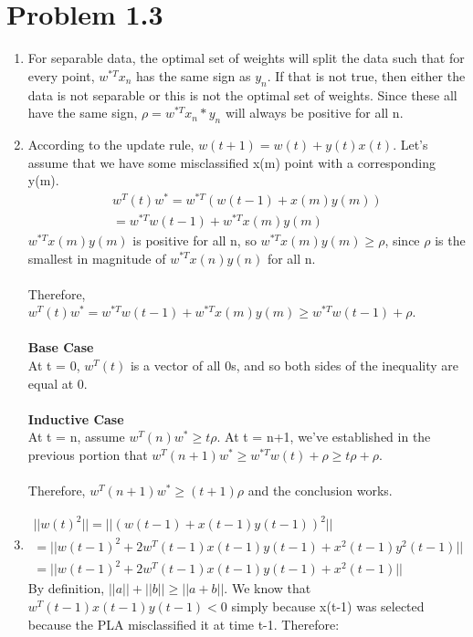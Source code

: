 \documentclass[12pt]{article}
\begin{document}
\section*{Problem 1.3}
\begin{enumerate}[label=(\alph*)]
	\item For separable data, the optimal set of weights will split the data such that for every point, $w^{*T}x_n$ has the same sign as $y_n$. If that is not true, then either the data is not separable or this is not the optimal set of weights. Since these all have the same sign, $\rho = w^{*T}x_n*y_n$ will always be positive for all n.
	\item According to the update rule, $w(t+1) = w(t) + y(t)x(t)$. Let's assume that we have some misclassified x(m) point with a corresponding y(m).
	\begin{gather*}
		w^T(t)w^* = w^{*T}(w(t-1) + x(m)y(m))
		\\ = w^{*T}w(t-1) + w^{*T}x(m)y(m)
	\end{gather*}
	$w^{*T}x(m)y(m)$ is positive for all n, so $w^{*T}x(m)y(m) \ge \rho$, since $\rho$ is the smallest in magnitude of $w^{*T}x(n)y(n)$ for all n.
	\\ \\ Therefore, $w^T(t)w^* = w^{*T}w(t-1) + w^{*T}x(m)y(m) \ge w^{*T}w(t-1) + \rho$.
	\\ \\ \textbf{Base Case}
	\\ At t = 0, $w^T(t)$ is a vector of all 0s, and so both sides of the inequality are equal at 0.
	\\ \\ \textbf{Inductive Case}
	\\ At t = n, assume $w^T(n)w^* \ge t\rho$. At t = n+1, we've established in the previous portion that $w^T(n+1)w^* \ge w^{*T}w(t) + \rho \ge t\rho + \rho$.
	\\ \\ Therefore, $w^T(n+1)w^* \ge (t+1)\rho$ and the conclusion works.
	\item 
	\begin{gather*}
		||w(t)^2|| = ||(w(t-1) + x(t-1)y(t-1))^2||
		\\ = ||w(t-1)^2 + 2w^T(t-1)x(t-1)y(t-1) + x^2(t-1)y^2(t-1)||
		\\ = ||w(t-1)^2 + 2w^T(t-1)x(t-1)y(t-1) + x^2(t-1)||		
	\end{gather*}
	By definition, $||a|| + ||b|| \ge ||a + b||$. We know that $w^T(t-1)x(t-1)y(t-1) < 0$ simply because x(t-1) was selected because the PLA misclassified it at time t-1. Therefore:

\end{enumerate}
\end{document}
